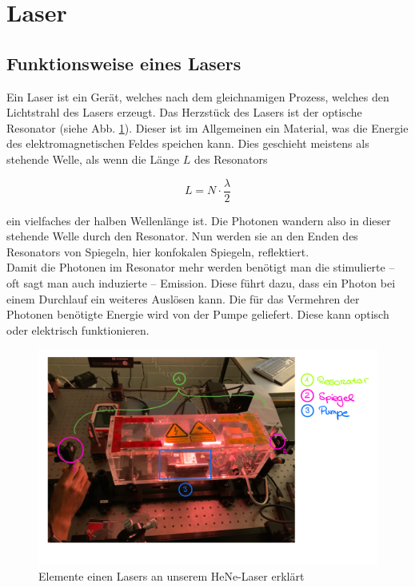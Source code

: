\section{Laser}
\subsection{Funktionsweise eines Lasers}

Ein Laser ist ein Gerät, welches nach dem gleichnamigen Prozess, welches den Lichtstrahl des Lasers erzeugt. Das Herzstück des 
Lasers ist der optische Resonator (siehe Abb. \ref{bild:LaserAufbau}). Dieser ist im Allgemeinen ein Material, was die Energie des elektromagnetischen Feldes speichen kann. Dies 
geschieht meistens als stehende Welle, als wenn die Länge $L$ des Resonators 

\begin{equation*}
    L = N\cdot\frac{\lambda}{2}
\end{equation*}

ein vielfaches der halben Wellenlänge ist. Die Photonen wandern also in dieser stehende Welle durch den Resonator. Nun werden sie an den Enden
des Resonators von Spiegeln, hier konfokalen Spiegeln, reflektiert. \\
Damit die Photonen im Resonator mehr werden benötigt man die stimulierte – oft sagt man auch induzierte – Emission. Diese führt dazu, dass ein Photon 
bei einem Durchlauf ein weiteres Auslösen kann. Die für das Vermehren der Photonen benötigte Energie wird von der Pumpe geliefert. Diese kann optisch 
oder elektrisch funktionieren.\\

\begin{figure}[ht]
    \centering
    \includegraphics[width = 14cm]{Bilder/Auswertung/LaserAufbau.png}
    \caption{Elemente einen Lasers an unserem HeNe-Laser erklärt}
    \label{bild:LaserAufbau}
\end{figure}

